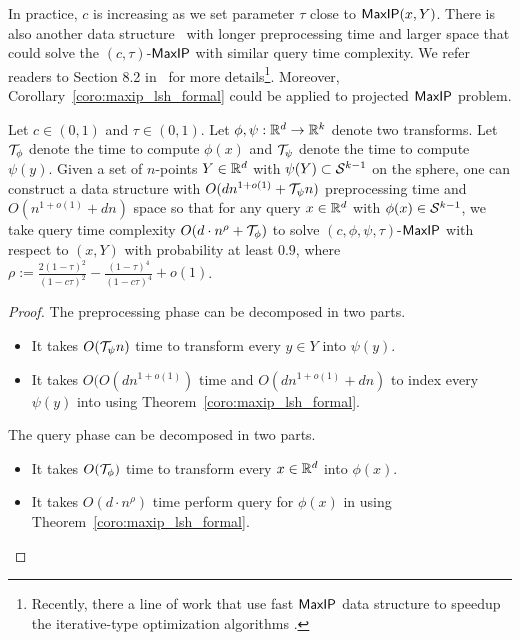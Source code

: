In practice, $c$ is increasing as we set parameter $\tau$ close to $\mathsf{MaxIP}(x,Y)$. 
There is also another {\lsh} data structure~\cite{ar15} with longer preprocessing time and larger space that could solve the $(c, \tau)$-$\mathsf{MaxIP}$ with similar query time complexity. We refer readers to Section 8.2 in~\cite{ssx21} for more details\footnote{Recently, there a line of work that use fast $\mathsf{MaxIP}$ data structure to speedup the iterative-type optimization algorithms \cite{ssx21,sy23,qsw23,swy23}.}. Moreover, Corollary~\ref{coro:maxip_lsh_formal} could be applied to projected $\mathsf{MaxIP}$ problem. 


\begin{theorem}[]\label{thm:proj_maxip_lsh}
Let $c \in (0,1)$ and $\tau \in(0,1)$. Let $\phi, \psi: \mathbb{R}^d \rightarrow \mathbb{R}^k$ denote two transforms.   Let ${\cal T}_{\phi}$ denote the time to compute $\phi(x)$ and ${\cal T}_{\psi}$ denote the time to compute $\psi(y)$. Given a set of $n$-points $Y\in \mathbb{R}^d$ with $\psi(Y) \subset {\cal S}^{k-1}$ on the sphere, one can construct a data structure with $O(dn^{1+o(1)}+{\cal T}_{\psi}n)$ preprocessing time and $O(n^{1+o(1)} + d n)$ space so that for any query $x \in \mathbb{R}^d$ with $\phi(x)\in {\cal S}^{k-1}$, we take query time complexity $O(d\cdot n^{\rho}+{\cal T}_{\phi})$ to solve $(c,\phi,\psi,\tau)$-$\mathsf{MaxIP}$ with respect to $(x,Y)$ with probability at least $0.9$, where $\rho:=  \frac{2(1-\tau)^2}{(1-c\tau)^2}-\frac{(1-\tau)^4}{(1-c\tau)^4}+o(1)$.
\end{theorem}

\begin{proof}

The preprocessing phase can be decomposed in two parts.
\begin{itemize}
    \item It takes $O({\cal T}_{\psi}n)$ time to transform every $y\in Y$ into $\psi(y)$.
    \item It takes $O(O(dn^{1+o(1)})$ time and $O(dn^{1+o(1)}+dn)$ to index every  $\psi(y)$ into {\lsh} using Theorem~\ref{coro:maxip_lsh_formal}.
\end{itemize}

The query phase can be decomposed in two parts.
\begin{itemize}
    \item It takes $O({\cal T}_{\phi})$ time to transform every $x\in \mathbb{R}^d$ into $\phi(x)$.
    \item It takes $O(d\cdot n^{\rho})$ time perform query for  $\phi(x)$ in {\lsh} using Theorem~\ref{coro:maxip_lsh_formal}.
\end{itemize}
\end{proof}

